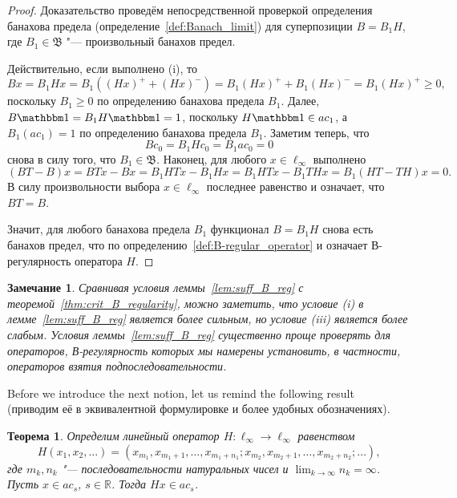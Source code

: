\documentclass[a4paper,14pt]{article} %
\newcommand{\R}{\ensuremath{\mathbb{R}}}
\newcommand{\B}{\ensuremath{\mathfrak{B}}}
\newcommand{\one}{\ensuremath{\mathbbm 1}}
\theoremstyle{plain}
\newtheorem{theorem}[lemma]{Теорема}
\newtheorem{remark}[lemma]{Замечание}
\begin{document}
	\begin{proof}
		Доказательство проведём непосредственной проверкой определения банахова предела
		(определение~\ref{def:Banach_limit})
		для суперпозиции $B = B_1 H$,
		где $B_1 \in \B$ "--- произвольный банахов предел.

		Действительно, если выполнено (i), то
		\begin{equation}
			Bx = B_1 Hx =
			B_1((Hx)^+ + (Hx)^-) =
			B_1(Hx)^+ + B_1(Hx)^- =
			B_1(Hx)^+
			\geq 0
			,
		\end{equation}
		поскольку $B_1 \geq 0$ по определению банахова предела $B_1$.
		Далее, $B\one = B_1 H \one = 1$, поскольку $H\one \in ac_1$,
		а $B_1(ac_1) = 1$ по определению банахова предела $B_1$.
		Заметим теперь, что
		\begin{equation}
			Bc_0 = B_1 H c_0 = B_1 ac_0 = 0
		\end{equation}
		снова в силу того, что $B_1\in\B$.
		Наконец, для любого $x\in\ell_\infty$ выполнено
		\begin{equation}
			(BT-B)x = BTx - Bx = B_1 HTx - B_1 H x = B_1 HTx - B_1 T H x = B_1 (HT -  T H) x = 0
			.
		\end{equation}
		В силу произвольности выбора $x\in \ell_\infty$ последнее равенство и означает, что $BT=B$.

		Значит, для любого банахова предела $B_1$ функционал $B=B_1 H$ снова есть банахов предел,
		что по определению~\ref{def:B-regular_operator}
		и означает В-регулярность оператора $H$.
	\end{proof}

	\begin{remark}
		Сравнивая условия леммы~\ref{lem:suff_B_reg} с теоремой~\ref{thm:crit_B_regularity},
		можно заметить, что условие (i) в лемме~\ref{lem:suff_B_reg} является более сильным,
		но условие (iii) является более слабым.
		Условия леммы~\ref{lem:suff_B_reg} существенно проще проверять для операторов,
		В-регулярность которых мы намерены установить, в частности, операторов взятия подпоследовательности.
	\end{remark}


	Before we introduce the next notion, let us remind the following result~\cite[теорема 1]{usachev2008transforms} (приводим её в эквивалентной формулировке и более удобных обозначениях).


	\begin{theorem}
		Определим линейный оператор $H:\ell_\infty\to\ell_\infty$ равенством
		\begin{equation}
			H(x_1, x_2, ...) = \left(x_{m_1}, x_{m_1+1}, \ldots, x_{m_1+n_1} ; x_{m_2}, x_{m_2+1}, \ldots, x_{m_2+n_2} ; \ldots\right)
			,
		\end{equation}
		где $m_k, n_k$ "--- последовательности натуральных чисел и $\lim_{k\to\infty} n_k = \infty$.
		Пусть $x\in ac_s$, $s\in\R$. Тогда $Hx \in ac_s$.
	\end{theorem}
\end{document}
